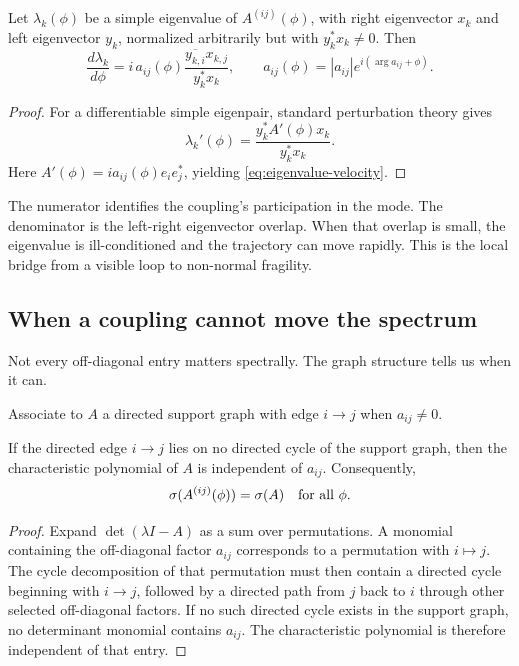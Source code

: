 \begin{proposition}
Let \(\lambda_k(\phi)\) be a simple eigenvalue of \(A^{(ij)}(\phi)\), with right eigenvector \(x_k\) and left eigenvector \(y_k\), normalized arbitrarily but with \(y_k^*x_k\neq0\).  Then
\begin{equation}
\frac{d\lambda_k}{d\phi}
=
 i\,a_{ij}(\phi)
\frac{\overline{y_{k,i}}x_{k,j}}{y_k^*x_k},
\qquad
a_{ij}(\phi)=|a_{ij}|e^{i(\arg a_{ij}+\phi)}.
\label{eq:eigenvalue-velocity}
\end{equation}
\end{proposition}

\begin{proof}
For a differentiable simple eigenpair, standard perturbation theory gives
\[
\lambda_k'(\phi)=\frac{y_k^*A'(\phi)x_k}{y_k^*x_k}.
\]
Here \(A'(\phi)=i a_{ij}(\phi)e_ie_j^*\), yielding \cref{eq:eigenvalue-velocity}.
\end{proof}

The numerator identifies the coupling's participation in the mode.  The denominator is the left-right eigenvector overlap.  When that overlap is small, the eigenvalue is ill-conditioned and the trajectory can move rapidly.  This is the local bridge from a visible loop to non-normal fragility.

\subsection{When a coupling cannot move the spectrum}

Not every off-diagonal entry matters spectrally.  The graph structure tells us when it can.

Associate to \(A\) a directed support graph with edge \(i\to j\) when \(a_{ij}\neq0\).

\begin{proposition}
If the directed edge \(i\to j\) lies on no directed cycle of the support graph, then the characteristic polynomial of \(A\) is independent of \(a_{ij}\).  Consequently,
\[
\sigma(A^{(ij)}(\phi))=\sigma(A)
\quad\text{for all }\phi.
\]
\end{proposition}

\begin{proof}
Expand \(\det(\lambda I-A)\) as a sum over permutations.  A monomial containing the off-diagonal factor \(a_{ij}\) corresponds to a permutation with \(i\mapsto j\).  The cycle decomposition of that permutation must then contain a directed cycle beginning with \(i\to j\), followed by a directed path from \(j\) back to \(i\) through other selected off-diagonal factors.  If no such directed cycle exists in the support graph, no determinant monomial contains \(a_{ij}\).  The characteristic polynomial is therefore independent of that entry.
\end{proof}

